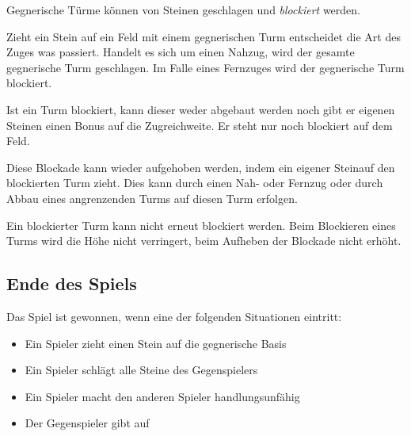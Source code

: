 
\newpage 
Gegnerische Türme können von Steinen geschlagen und \emph{blockiert} werden. 

Zieht ein Stein auf ein Feld mit einem gegnerischen Turm entscheidet die Art des Zuges was passiert. Handelt es sich um einen Nahzug, wird der gesamte gegnerische Turm geschlagen. Im Falle eines Fernzuges wird der gegnerische Turm blockiert.


Ist ein Turm blockiert, kann dieser weder abgebaut werden noch gibt er eigenen Steinen einen Bonus auf die Zugreichweite. Er steht nur noch blockiert auf dem Feld. 


Diese Blockade kann wieder aufgehoben werden, indem ein eigener Steinauf den blockierten Turm zieht. Dies kann durch einen Nah- oder Fernzug oder durch Abbau eines angrenzenden Turms auf diesen Turm erfolgen.

Ein blockierter Turm kann nicht erneut blockiert werden. Beim Blockieren eines Turms wird die Höhe nicht verringert, beim Aufheben der Blockade nicht erhöht.

\newpage



\subsection*{Ende des Spiels}
Das Spiel ist gewonnen, wenn eine der folgenden Situationen eintritt:
\begin{itemize}
\item Ein Spieler zieht einen Stein auf die gegnerische Basis
\item Ein Spieler schlägt alle Steine des Gegenspielers
\item Ein Spieler macht den anderen Spieler handlungsunfähig
\item Der Gegenspieler gibt auf
\end{itemize}

